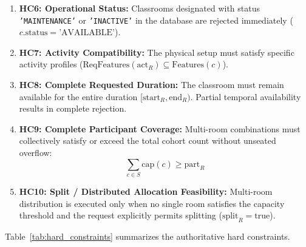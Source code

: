 \documentclass[conference]{IEEEtran}
\begin{document}
\begin{enumerate}
\begin{equation}
    \end{equation}
    \item \textbf{HC6: Operational Status:} Classrooms designated with status \texttt{'MAINTENANCE'} or \texttt{'INACTIVE'} in the database are rejected immediately ($c.\text{status} = \text{'AVAILABLE'}$).
    \item \textbf{HC7: Activity Compatibility:} The physical setup must satisfy specific activity profiles ($\text{ReqFeatures}(\text{act}_R) \subseteq \text{Features}(c)$).
    \item \textbf{HC8: Complete Requested Duration:} The classroom must remain available for the entire duration $[\text{start}_R, \text{end}_R)$. Partial temporal availability results in complete rejection.
    \item \textbf{HC9: Complete Participant Coverage:} Multi-room combinations must collectively satisfy or exceed the total cohort count without unseated overflow:
    \begin{equation}
    \sum_{c \in S} \text{cap}(c) \ge \text{part}_R
    \end{equation}
    \item \textbf{HC10: Split / Distributed Allocation Feasibility:} Multi-room distribution is executed only when no single room satisfies the capacity threshold and the request explicitly permits splitting ($\text{split}_R = \text{true}$).
\end{enumerate}

Table~\ref{tab:hard_constraints} summarizes the authoritative hard constraints.
\end{document}
